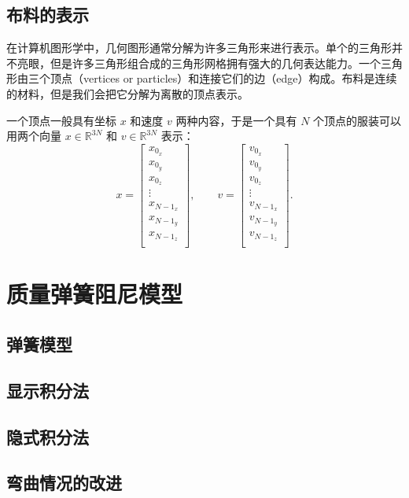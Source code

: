 \documentclass{article}
\begin{document}
\subsection{布料的表示}
\par 在计算机图形学中，几何图形通常分解为许多三角形来进行表示。单个的三角形并不亮眼，但是许多三角形组合成的三角形网格拥有强大的几何表达能力。一个三角形由三个顶点（vertices or particles）和连接它们的边（edge）构成。布料是连续的材料，但是我们会把它分解为离散的顶点表示。
\par 一个顶点一般具有坐标 $x$ 和速度 $v$ 两种内容，于是一个具有 $N$ 个顶点的服装可以用两个向量 $x \in \mathbb{R}^{3N}$ 和 $v \in \mathbb{R}^{3N}$ 表示：\cite{CloSim}
$$ x = \begin{bmatrix}
    x_{0_x} \\
    x_{0_y} \\
    x_{0_z} \\
    \vdots \\
    x_{{N-1}_x} \\
    x_{{N-1}_y} \\
    x_{{N-1}_z} \\
\end{bmatrix}, \quad\quad
v = \begin{bmatrix}
    v_{0_x} \\
    v_{0_y} \\
    v_{0_z} \\
    \vdots \\
    v_{{N-1}_x} \\
    v_{{N-1}_y} \\
    v_{{N-1}_z} \\
\end{bmatrix}.
$$
\section{质量弹簧阻尼模型}
\subsection{弹簧模型}
\subsection{显示积分法}
\subsection{隐式积分法}
\subsection{弯曲情况的改进}
\end{document}
